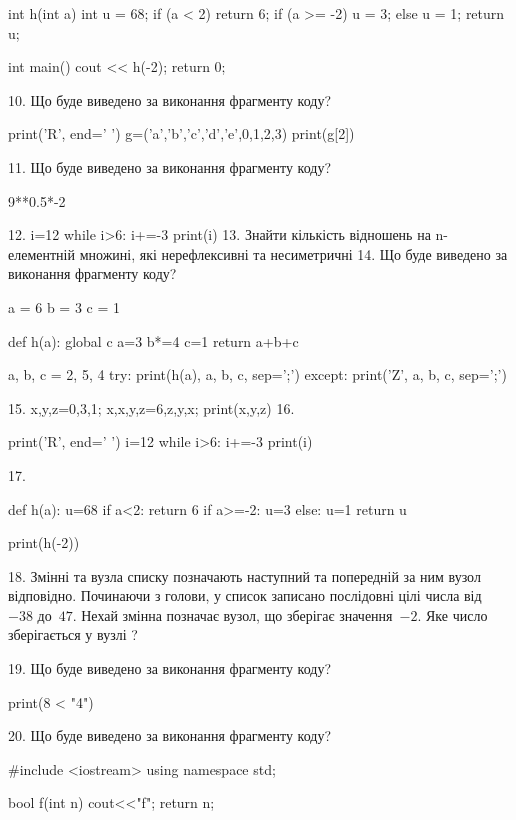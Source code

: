 \documentclass[11pt]{article}
\begin{document}
int h(int a){
    int u = 68;
    if (a < 2) 
        return 6;
    if (a >= -2)
         u = 3;
    else
         u = 1;
    return u;
}

int main(){
    cout << h(-2);
    return 0;
}


10. Що буде виведено за виконання фрагменту коду?

print('R', end=' ')
g=('a','b','c','d','e',0,1,2,3)
print(g[2])


11. Що буде виведено за виконання фрагменту коду?

9**0.5*-2

12. 
i=12
   while i>6: i+=-3
   print(i)
13. 
Знайти кількість відношень на n-елементній множині, які нерефлексивні та несиметричні
14. Що буде виведено за виконання фрагменту коду?

a = 6
b = 3
c = 1

def h(a):
global c    a=3
    b*=4
    c=1
    return a+b+c

a, b, c = 2, 5, 4
try:
    print(h(a), a, b, c, sep=';')
except:
    print('Z', a, b, c, sep=';')

15. 
x,y,z=0,3,1;  x,x,y,z=6,z,y,x;  print(x,y,z)
16. 

print('R', end=' ')
i=12
while i>6:
    i+=-3
print(i)


17. 

def h(a):
    u=68
    if a<2: 
        return 6
    if a>=-2:
         u=3
    else:
         u=1
    return u

print(h(-2))

18. 
Змінні  та  вузла списку позначають наступний та попередній за ним вузол відповідно. Починаючи з голови, у список записано послідовні цілі числа від~$-38$ до~$47$. Нехай змінна  позначає вузол, що зберігає значення~$-2$.
Яке число зберігається у вузлі  ?

19. Що буде виведено за виконання фрагменту коду?

print(8 < "4")

20. Що буде виведено за виконання фрагменту коду?

#include <iostream>
using namespace std;

bool f(int n){
    cout<<"f";
    return n;
}
\end{document}
